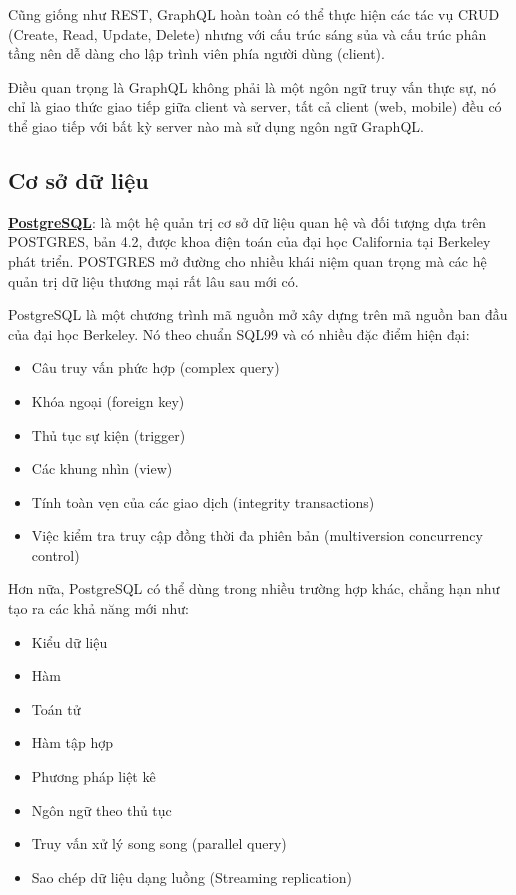 \documentclass[12pt,a4paper]{article}
\begin{document}
    Cũng giống như REST, GraphQL hoàn toàn có thể thực hiện các tác vụ CRUD (Create, Read, Update, Delete) nhưng với cấu trúc sáng sủa và cấu trúc phân tầng nên dễ dàng cho lập trình viên phía người dùng (client).

    Điều quan trọng là GraphQL không phải là một ngôn ngữ truy vấn thực sự, nó chỉ là giao thức giao tiếp giữa client và server, tất cả client (web, mobile) đều có thể giao tiếp với bất kỳ server nào mà sử dụng ngôn ngữ GraphQL.

    \subsection{Cơ sở dữ liệu}
    \textbf{\underline{PostgreSQL}}: là một hệ quản trị cơ sở dữ liệu quan hệ và đối tượng dựa trên POSTGRES, bản 4.2, được khoa điện toán của đại học California tại Berkeley phát triển. POSTGRES mở đường cho nhiều khái niệm quan trọng mà các hệ quản trị dữ liệu thương mại rất lâu sau mới có.

    PostgreSQL là một chương trình mã nguồn mở xây dựng trên mã nguồn ban đầu của đại học Berkeley. Nó theo chuẩn SQL99 và có nhiều đặc điểm hiện đại:

    \begin{itemize}
        \item Câu truy vấn phức hợp (complex query)
        \item Khóa ngoại (foreign key)
        \item Thủ tục sự kiện (trigger)
        \item Các khung nhìn (view)
        \item Tính toàn vẹn của các giao dịch (integrity transactions)
        \item Việc kiểm tra truy cập đồng thời đa phiên bản (multiversion concurrency control)
    \end{itemize}

    Hơn nữa, PostgreSQL có thể dùng trong nhiều trường hợp khác, chẳng hạn như tạo ra các khả năng mới như:

    \begin{itemize}
        \item Kiểu dữ liệu
        \item Hàm
        \item Toán tử
        \item Hàm tập hợp
        \item Phương pháp liệt kê
        \item Ngôn ngữ theo thủ tục
        \item Truy vấn xử lý song song (parallel query)
        \item Sao chép dữ liệu dạng luồng (Streaming replication)
    \end{itemize}
\end{document}
